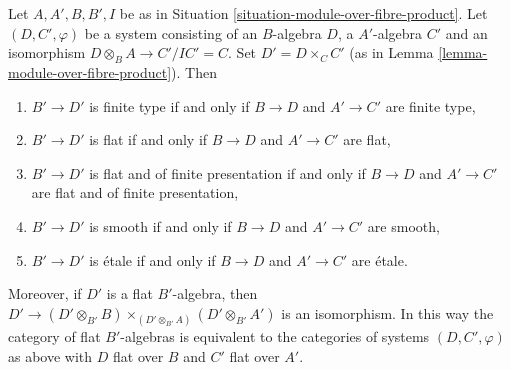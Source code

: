 \begin{lemma}
\label{lemma-properties-algebras-over-fibre-product}
Let $A, A', B, B', I$ be as in
Situation \ref{situation-module-over-fibre-product}.
Let $(D, C', \varphi)$ be a system consisting of an $B$-algebra $D$,
a $A'$-algebra $C'$ and an isomorphism $D \otimes_B A \to C'/IC' = C$.
Set $D' = D \times_C C'$ (as in
Lemma \ref{lemma-module-over-fibre-product}). Then
\begin{enumerate}
\item $B' \to D'$ is finite type if and only if $B \to D$ and
$A' \to C'$ are finite type,
\item $B' \to D'$ is flat if and only if $B \to D$ and $A' \to C'$ are flat,
\item $B' \to D'$ is flat and of finite presentation if and only if
$B \to D$ and $A' \to C'$ are flat and of finite presentation,
\item $B' \to D'$ is smooth if and only if $B \to D$ and $A' \to C'$ are smooth,
\item $B' \to D'$ is \'etale if and only if $B \to D$ and $A' \to C'$
are \'etale.
\end{enumerate}
Moreover, if $D'$ is a flat $B'$-algebra, then
$D' \to (D' \otimes_{B'} B) \times_{(D' \otimes_{B'} A)} (D' \otimes_{B'} A')$
is an isomorphism. In this way the category of flat $B'$-algebras
is equivalent to the categories of systems $(D, C', \varphi)$ as above
with $D$ flat over $B$ and $C'$ flat over $A'$.
\end{lemma}

